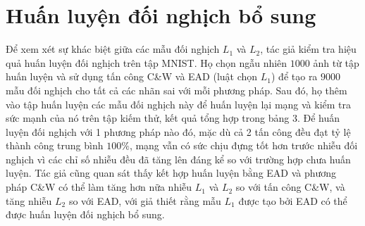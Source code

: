 \section{Huấn luyện đối nghịch bổ sung}
Để xem xét sự khác biệt giữa các mẫu đối nghịch $L_1$ và $L_2$, tác giả kiểm tra hiệu quả huấn luyện đối nghịch trên tập MNIST. Họ chọn ngẫu nhiên $1000$ ảnh từ tập huấn luyện và sử dụng tấn công C\&W và EAD (luật chọn $L_1$) để tạo ra $9000$ mẫu đối nghịch cho tất cả các nhãn sai với mỗi phương pháp. Sau đó, họ thêm vào tập huấn luyện các mẫu đối nghịch này để huấn luyện lại mạng và kiểm tra sức mạnh của nó trên tập kiếm thử, kết quả tổng hợp trong bảng 3. Để huấn luyện đối nghịch với 1 phương pháp nào đó, mặc dù cả 2 tấn công đều đạt tỷ lệ thành công trung bình $100\%$, mạng vẫn có sức chịu đựng tốt hơn trước nhiễu đối nghịch vì các chỉ số nhiễu đều đã tăng lên đáng kể so với trường hợp chưa huấn luyện. Tác giả cũng quan sát thấy kết hợp huấn luyện bằng EAD và phương pháp C\&W có thể làm tăng hơn nữa nhiễu $L_1$ và $L_2$ so với tấn công C\&W, và tăng nhiễu $L_2$ so với EAD, với giả thiết rằng mẫu $L_1$ được tạo bởi EAD có thể được huấn luyện đối nghịch bổ sung.  
